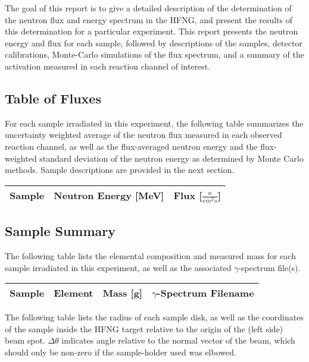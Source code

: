 \documentclass[aps,twocolumn,secnumarabic,balancelastpage,amsmath,amssymb,nofootinbib,floatfix]{revtex4-1}
\begin{document}
The goal of this report is to give a detailed description of the determination of the neutron flux and energy spectrum in the HFNG, and present the results of this determination for a particular experiment.  This report presents the neutron energy and flux for each sample, followed by descriptions of the samples, detector calibrations, Monte-Carlo simulations of the flux spectrum, and a summary of the activation measured in each reaction channel of interest.

\subsection{Table of Fluxes}

For each sample irradiated in this experiment, the following table summarizes the uncertainty weighted average of the neutron flux measured in each observed reaction channel, as well as the flux-averaged neutron energy and the flux-weighted standard deviation of the neutron energy as determined by Monte Carlo methods.  Sample descriptions are provided in the next section. \\

\begin{ruledtabular}
\begin{tabular}{ccc}
Sample & Neutron Energy [MeV] & Flux [$\frac{n}{cm^2s}$] \\
\hline

\end{tabular}
\end{ruledtabular}


\subsection{Sample Summary}

The following table lists the elemental composition and measured mass for each sample irradiated in this experiment, as well as the associated $\gamma$-spectrum file(s). \\

\begin{ruledtabular}
\begin{tabular}{cccc}
Sample & Element & Mass [g] & $\gamma$-Spectrum Filename \\
\hline

\end{tabular}
\end{ruledtabular}

The following table lists the radius of each sample disk, as well as the coordinates of the sample inside the HFNG target relative to the origin of the (left side) beam spot.  $\Delta \theta$ indicates angle relative to the normal vector of the beam, which should only be non-zero if the sample-holder used was elbowed. \\
\end{document}
